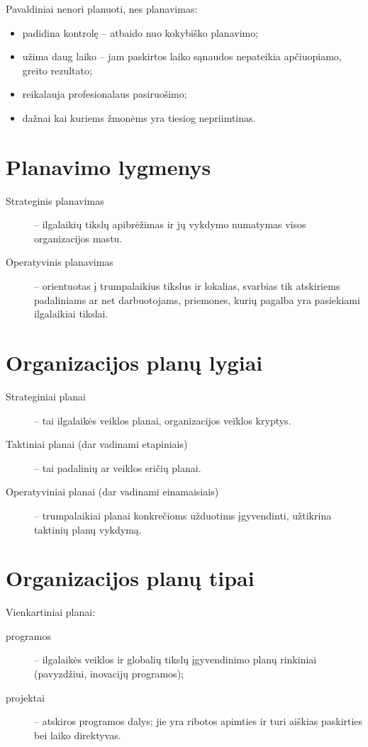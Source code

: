 Pavaldiniai nenori planuoti, nes planavimas:
\begin{itemize}
  \item padidina kontrolę – atbaido nuo kokybiško planavimo;
  \item užima daug laiko – jam paskirtos laiko sąnaudos nepateikia
    apčiuopiamo, greito rezultato;
  \item reikalauja profesionalaus pasiruošimo;
  \item dažnai kai kuriems žmonėms yra tiesiog nepriimtinas.
\end{itemize}

\section{Planavimo lygmenys}

\begin{description}
  \item[Strateginis planavimas] – ilgalaikių tikslų apibrėžimas ir jų
    vykdymo numatymas visos organizacijos mastu.
  \item[Operatyvinis planavimas] – orientuotas į trumpalaikius tikslus
    ir lokalias, svarbias tik atskiriems padaliniams ar net darbuotojams,
    priemones, kurių pagalba yra pasiekiami ilgalaikiai tikslai.
\end{description}

\section{Organizacijos planų lygiai}

\begin{description}
  \item[Strateginiai planai] – tai ilgalaikės veiklos planai, organizacijos
    veiklos kryptys.
  \item[Taktiniai planai (dar vadinami etapiniais)] – tai padalinių
    ar veiklos sričių planai.
  \item[Operatyviniai planai (dar vadinami einamaisiais)] – trumpalaikiai
    planai konkrečioms užduotims įgyvendinti, užtikrina taktinių planų
    vykdymą.
\end{description}

\section{Organizacijos planų tipai}

Vienkartiniai planai:
\begin{description}
  \item[programos] – ilgalaikės veiklos ir globalių tikslų įgyvendinimo
    planų rinkiniai (pavyzdžiui, inovacijų programos);
  \item[projektai] – atskiros programos dalys; jie yra ribotos apimties
    ir turi aiškias paskirties bei laiko direktyvas.
\end{description}

